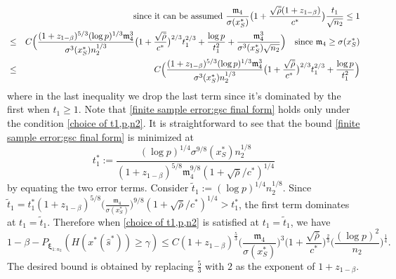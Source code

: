 \documentclass[mnsc,blindrev]{informs4} %
\begin{document}
\begin{eqnarray}
\notag&&\text{\ \ since it can be assumed $\frac{\mathfrak{m}_4}{\sigma(x^*_S)}\big(1+\frac{\sqrt{\bar{\rho}}(1+z_{1-\beta})}{c^*}\big)\frac{t_1}{\sqrt{n_2}}\leq 1$}\\
\notag&\leq &C\Big(\frac{(1+z_{1-\beta})^{5/3}(\log p)^{1/3}\mathfrak{m}_4^3}{\sigma^3(x^*_S)n_2^{1/3}}\big(1+\frac{\sqrt{\bar{\rho}}}{c^*}\big)^{2/3}t_1^{2/3}+\frac{\log p}{t_1^2}+\frac{\mathfrak{m}_4^3}{\sigma^3(x^*_S)\sqrt{n_2}}\Big)\text{ \ \ since }\mathfrak{m}_4\geq \sigma(x^*_S)\\
&\leq &C\Big(\frac{(1+z_{1-\beta})^{5/3}(\log p)^{1/3}\mathfrak{m}_4^3}{\sigma^3(x^*_S)n_2^{1/3}}\big(1+\frac{\sqrt{\bar{\rho}}}{c^*}\big)^{2/3}t_1^{2/3}+\frac{\log p}{t_1^2}\Big)\label{finite sample error:gsc final form}
\end{eqnarray}
where in the last inequality we drop the last term since it's dominated by the first when $t_1\geq 1$. Note that \eqref{finite sample error:gsc final form} holds only under the condition \eqref{choice of t1,p,n2}. It is straightforward to see that the bound \eqref{finite sample error:gsc final form} is minimized at
\begin{equation*}
    t_1^*:=\frac{(\log p)^{1/4}\sigma^{9/8}(x^*_S)n_2^{1/8}}{(1+z_{1-\beta})^{5/8}\mathfrak{m}_4^{9/8}(1+\sqrt{\bar{\rho}}/c^*)^{1/4}}
\end{equation*}
by equating the two error terms. Consider $\tilde t_1:=(\log p)^{1/4}n_2^{1/8}$. Since $\tilde t_1=t^*_1(1+z_{1-\beta})^{5/8}\big(\frac{\mathfrak{m}_4}{\sigma(x^*_S)}\big)^{9/8}(1+\sqrt{\bar{\rho}}/c^*)^{1/4}>t^*_1$, the first term dominates at $t_1=\tilde t_1$. Therefore when \eqref{choice of t1,p,n2} is satisfied at $t_1=\tilde t_1$, we have
\begin{equation*}
    1-\beta-P_{\bm{\xi}_{1:n_2}}(H(x^*(\hat s^*))\geq \gamma)\leq C(1+z_{1-\beta})^{\frac{5}{3}}\big(\frac{\mathfrak{m}_4}{\sigma(x^*_S)}\big)^3\big(1+\frac{\sqrt{\bar{\rho}}}{c^*}\big)^{\frac{2}{3}}\big(\frac{(\log p)^2}{n_2}\big)^{\frac{1}{4}}.
\end{equation*}
The desired bound is obtained by replacing $\frac{5}{3}$ with $2$ as the exponent of $1+z_{1-\beta}$.\hfill\Halmos

\end{document}
